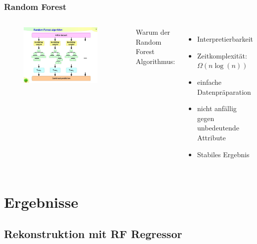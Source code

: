 \documentclass[aspectratio=1610, professionalfonts, 9pt]{beamer}
\begin{document}
  \begin{frame}
    \frametitle{Random Forest}
    \begin{columns}
      \begin{figure}
        \includegraphics[width=0.9\textwidth]{pictures/RF.jpg}
        \caption{\cite{RF}}
        \label{abb:RF}
      \end{figure}
      Warum der Random Forest Algorithmus:
      \begin{itemize}
        \item Interpretierbarkeit
        \item Zeitkomplexität: $\Omega(n\log(n))$
        \item einfache Datenpräparation
        \item nicht anfällig gegen unbedeutende Attribute
        \item Stabiles Ergebnis
      \end{itemize}
    \end{columns}
  \end{frame}

  \section{Ergebnisse}
  \subsection{Rekonstruktion mit RF Regressor}
\end{document}

